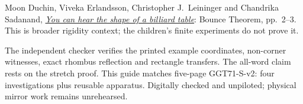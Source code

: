 \documentclass[11pt,letterpaper]{article}
\begin{document}
Moon Duchin, Viveka Erlandsson, Christopher J.~Leininger and Chandrika Sadanand, \href{https://arxiv.org/pdf/1804.05690}{\emph{You can hear the shape of a billiard table}}: Bounce Theorem, pp.~2--3. This is broader rigidity context; the children's finite experiments do not prove it.

The independent checker verifies the printed example coordinates, non-corner witnesses, exact rhombus reflection and rectangle transfers. The all-word claim rests on the stretch proof. This guide matches five-page GGT71-S-v2: four investigations plus reusable apparatus. Digitally checked and unpiloted; physical mirror work remains unrehearsed.
\end{document}
